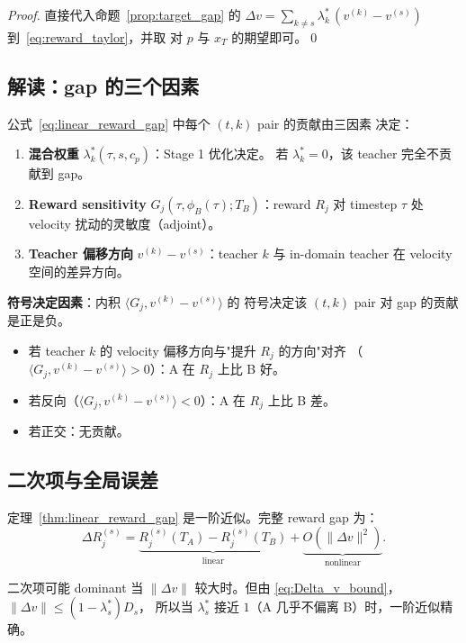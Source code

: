 \documentclass[11pt,a4paper]{article}
\theoremstyle{definition}
\begin{document}
\begin{proof}
直接代入命题~\ref{prop:target_gap} 的 $\Delta v = \sum_{k \neq s}
\lambda_k^*\,(v^{(k)} - v^{(s)})$ 到~\eqref{eq:reward_taylor}，并取
对 $p$ 与 $x_T$ 的期望即可。\qed
\end{proof}

\subsection{解读：gap 的三个因素}

公式~\eqref{eq:linear_reward_gap} 中每个 $(t, k)$ pair 的贡献由三因素
决定：
\begin{enumerate}[leftmargin=1.5em]
\item \textbf{混合权重} $\lambda_k^*(\tau, s, c_p)$：Stage 1 优化决定。
若 $\lambda_k^* = 0$，该 teacher 完全不贡献到 gap。
\item \textbf{Reward sensitivity} $G_j(\tau, \phi_B(\tau); T_B)$：reward
$R_j$ 对 timestep $\tau$ 处 velocity 扰动的灵敏度（adjoint）。
\item \textbf{Teacher 偏移方向} $v^{(k)} - v^{(s)}$：teacher $k$ 与
in-domain teacher 在 velocity 空间的差异方向。
\end{enumerate}

\textbf{符号决定因素}：内积 $\langle G_j, v^{(k)} - v^{(s)}\rangle$ 的
符号决定该 $(t, k)$ pair 对 gap 的贡献是正是负。
\begin{itemize}[leftmargin=1.5em]
\item 若 teacher $k$ 的 velocity 偏移方向与"提升 $R_j$ 的方向"对齐
（$\langle G_j, v^{(k)} - v^{(s)}\rangle > 0$）：A 在 $R_j$ 上比 B 好。
\item 若反向（$\langle G_j, v^{(k)} - v^{(s)}\rangle < 0$）：A 在 $R_j$
上比 B 差。
\item 若正交：无贡献。
\end{itemize}

\subsection{二次项与全局误差}

定理~\ref{thm:linear_reward_gap} 是一阶近似。完整 reward gap 为：
\begin{equation}
\Delta R_j^{(s)} = \underbrace{R_j^{(s)}(T_A) - R_j^{(s)}(T_B)}_{\text{linear}}
+ \underbrace{O(\|\Delta v\|^2)}_{\text{nonlinear}}.
\end{equation}

二次项可能 dominant 当 $\|\Delta v\|$ 较大时。但由
\eqref{eq:Delta_v_bound}，$\|\Delta v\| \leq (1 - \lambda_s^*) D_s$，
所以当 $\lambda_s^*$ 接近 $1$（A 几乎不偏离 B）时，一阶近似精确。
\end{document}
